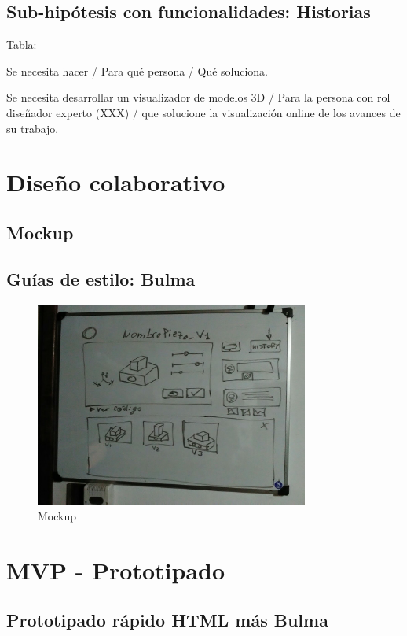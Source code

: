 \subsection{Sub-hipótesis con funcionalidades: Historias}

Tabla:

Se necesita hacer / Para qué persona / Qué soluciona.

Se necesita desarrollar un visualizador de modelos 3D / Para la persona con rol diseñador experto (XXX) / que solucione la visualización online de los avances de su trabajo.



\section{Diseño colaborativo}

\subsection{Mockup}

\subsection{Guías de estilo: Bulma}


\begin{figure}
\centering
\includegraphics[width=9cm]{Img/UX/UX-proto1.jpg}
\caption[Proto-persona (optional short caption)]{\label{us_figure} Mockup}
\end{figure}

\section{MVP - Prototipado}
\subsection{Prototipado rápido HTML más Bulma}

